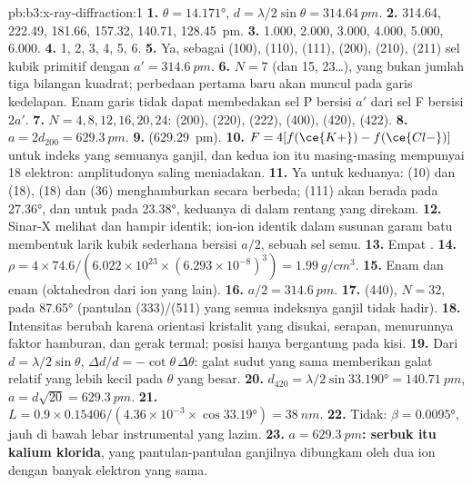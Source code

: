 \begin{solution}{pb:b3:x-ray-diffraction:1}
\textbf{1.} $\theta = \ang{14.171}$, $d = \lambda/2\sin\theta = \qty{314.64}{pm}$.
\textbf{2.} 314.64, 222.49, 181.66, 157.32, 140.71, \qty{128.45}{pm}.
\textbf{3.} 1.000, 2.000, 3.000, 4.000, 5.000, 6.000.
\textbf{4.} 1, 2, 3, 4, 5, 6.
\textbf{5.} Ya, sebagai (100), (110), (111), (200), (210), (211) sel kubik
primitif dengan $a' = \qty{314.6}{pm}$.
\textbf{6.} $N = 7$ (dan 15, 23\dots), yang bukan jumlah tiga bilangan kuadrat;
perbedaan pertama baru akan muncul pada garis kedelapan. Enam garis tidak
dapat membedakan sel P bersisi $a'$ dari sel F bersisi $2a'$.
\textbf{7.} $N = 4, 8, 12, 16, 20, 24$: (200), (220), (222), (400), (420), (422).
\textbf{8.} $a = 2d_{200} = \qty{629.3}{pm}$.
\textbf{9.}  (\qty{629.29}{pm}).
\textbf{10.} $F = 4[f(\ce{K+}) - f(\ce{Cl-})]$ untuk indeks yang semuanya ganjil, dan
kedua ion itu masing-masing mempunyai 18 elektron: amplitudonya saling
meniadakan.
\textbf{11.} Ya untuk keduanya:  (10) dan  (18),  (18) dan
 (36) menghamburkan secara berbeda; (111)  akan berada pada
\ang{27.36}, dan untuk  pada \ang{23.38}, keduanya di dalam rentang yang
direkam.
\textbf{12.} Sinar-X melihat  dan  hampir identik; ion-ion identik
dalam susunan garam batu membentuk larik kubik sederhana bersisi $a/2$, sebuah
sel semu.
\textbf{13.} Empat .
\textbf{14.} $\rho = 4 \times 74.6/(6.022\times10^{23} \times (6.293\times10^{-8})^3) =
\qty{1.99}{g/cm^3}$.
\textbf{15.} Enam dan enam (oktahedron dari ion yang lain).
\textbf{16.} $a/2 = \qty{314.6}{pm}$.
\textbf{17.} (440), $N = 32$, pada \ang{87.65} (pantulan (333)/(511) yang semua
indeksnya ganjil tidak hadir).
\textbf{18.} Intensitas berubah karena orientasi kristalit yang disukai,
serapan, menurunnya faktor hamburan, dan gerak termal; posisi hanya
bergantung pada kisi.
\textbf{19.} Dari $d = \lambda/2\sin\theta$, $\Delta d/d = -\cot\theta\,\Delta\theta$: galat
sudut yang sama memberikan galat relatif yang lebih kecil pada $\theta$ yang
besar.
\textbf{20.} $d_{420} = \lambda/2\sin\ang{33.190} = \qty{140.71}{pm}$, $a = d\sqrt{20} =
\qty{629.3}{pm}$.
\textbf{21.} $L = 0.9 \times 0.15406/(4.36\times10^{-3} \times \cos\ang{33.19}) = \qty{38}{nm}$.
\textbf{22.} Tidak: $\beta = \ang{0.0095}$, jauh di bawah lebar instrumental yang
lazim.
\textbf{23.} \textbf{$a = \qty{629.3}{pm}$: serbuk itu kalium klorida}, yang
pantulan-pantulan ganjilnya dibungkam oleh dua ion dengan banyak elektron
yang sama.
\end{solution}
